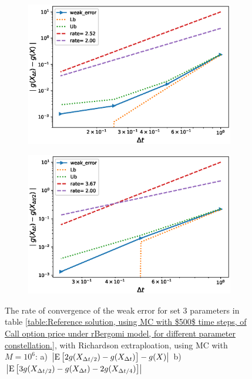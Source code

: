 \documentclass[11pt]{article}
\newcommand{\expt}[1]{\mathrm{E}\left[#1\right]}
\begin{document}
\begin{figure}[!htbp]
	\centering
	\begin{subfigure}{.4\textwidth}
		\centering
		\includegraphics[width=1\linewidth]{./figures/rBergomi_weak_error_rates/with_richardson/H_007/weak_convergence_order_Bergomi_H_007_K_08_M_10_6_richardson_relative}
		\caption{}
		\label{fig:sub3}
	\end{subfigure}%
	\begin{subfigure}{.4\textwidth}
		\centering
		\includegraphics[width=1\linewidth]{./figures/rBergomi_weak_error_rates/with_richardson/H_007/weak_convergence_order_differences_Bergomi_H_007_K_08_M_10_6_richardson_relative}
		\caption{}
		\label{fig:sub4}
	\end{subfigure}
	

	\caption{The rate of convergence of the weak error for set $3$ parameters in table \ref{table:Reference solution, using MC with $500$ time steps, of Call option price under rBergomi model, for different parameter constellation.}, with Richardson extraploation, using MC with $M=10^6$: a) $\abs{\expt{2 g(X_{\Delta t/2}) -g(X_{\Delta t})}-g(X)}$  b) $\abs{\expt{3 g(X_{\Delta t/2})-g(X_{\Delta t})-2 g(X_{\Delta t/4})}}$ }
	\label{fig:Weak_rate_H_007_with_rich_K08}
\end{figure}
\end{document}
